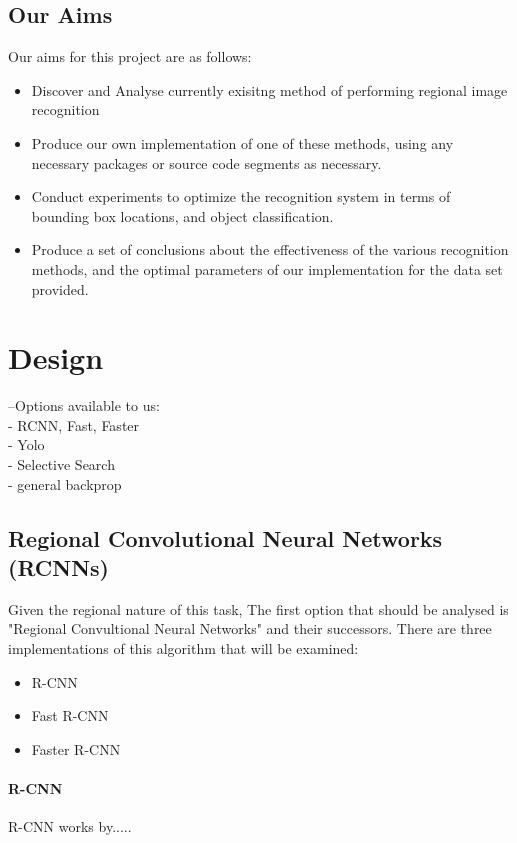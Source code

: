 \documentclass[10pt]{article}
\begin{document}
\subsection{Our Aims}
Our aims for this project are as follows:
\begin{itemize}
	\item Discover and Analyse currently exisitng method of performing regional image recognition
	\item Produce our own implementation of one of these methods, using any necessary packages or source code segments as necessary.
	\item Conduct experiments to optimize the recognition system in terms of bounding box locations, and object classification.
	\item Produce a set of conclusions about the effectiveness of the various recognition methods, and the optimal parameters of our implementation for the data set provided.
\end {itemize}

\section{Design}
--Options available to us:\\
	- RCNN, Fast, Faster\\
	- Yolo\\
	- Selective Search\\
	- general backprop\\
	
\subsection{Regional Convolutional Neural Networks (RCNNs)}
	Given the regional nature of this task, The first option that should be analysed is "Regional Convultional Neural Networks" and their successors. There are three implementations of this algorithm that will be examined:
	\begin{itemize}
		\item R-CNN
		\item Fast R-CNN \cite{fast_rcnn}
		\item Faster R-CNN \cite{faster_rcnn}
	\end{itemize}
	
\paragraph{R-CNN}
R-CNN works by.....
\end{document}
